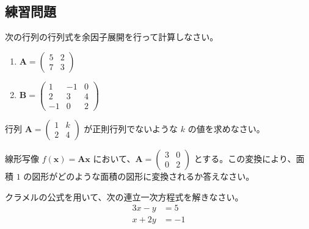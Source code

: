 \subsection{練習問題}

\begin{quiz}
次の行列の行列式を余因子展開を行って計算しなさい。
\begin{enumerate}
    \item $\bm{A} = \begin{pmatrix} 5 & 2 \\ 7 & 3 \end{pmatrix}$
    \item $\bm{B} = \begin{pmatrix} 1 & -1 & 0 \\ 2 & 3 & 4 \\ -1 & 0 & 2 \end{pmatrix}$ 
\end{enumerate}
\end{quiz}

\begin{quiz}
行列 $\bm{A} = \begin{pmatrix} 1 & k \\ 2 & 4 \end{pmatrix}$ が正則行列でないような $k$ の値を求めなさい。
\end{quiz}

\begin{quiz}
線形写像 $f(\bm{x}) = \bm{A}\bm{x}$ において、$\bm{A} = \begin{pmatrix} 3 & 0 \\ 0 & 2 \end{pmatrix}$ とする。この変換により、面積 $1$ の図形がどのような面積の図形に変換されるか答えなさい。
\end{quiz}

\begin{quiz}
クラメルの公式を用いて、次の連立一次方程式を解きなさい。
\begin{align*} 3x - y &= 5 \\ x + 2y &= -1 \end{align*}
\end{quiz}